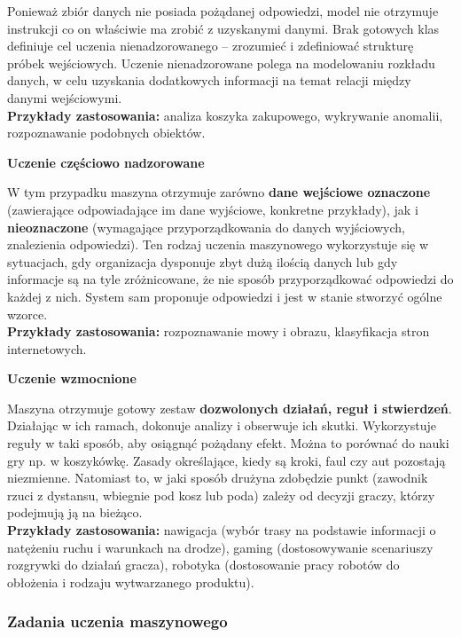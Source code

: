 Ponieważ zbiór danych nie posiada pożądanej odpowiedzi, model nie otrzymuje instrukcji co on właściwie ma zrobić z uzyskanymi danymi. Brak gotowych klas definiuje cel uczenia nienadzorowanego – zrozumieć i zdefiniować strukturę próbek wejściowych. Uczenie nienadzorowane polega na modelowaniu rozkładu danych, w celu uzyskania dodatkowych informacji na temat relacji między danymi wejściowymi. \\

\textbf{Przykłady zastosowania:} analiza koszyka zakupowego, wykrywanie anomalii, rozpoznawanie podobnych obiektów. \\

\centerline{\textbf{Uczenie częściowo nadzorowane}}

W tym przypadku maszyna otrzymuje zarówno \textbf{dane wejściowe oznaczone} (zawierające odpowiadające im dane wyjściowe, konkretne przykłady), jak i \textbf{nieoznaczone} (wymagające przyporządkowania do danych wyjściowych, znalezienia odpowiedzi). Ten rodzaj uczenia maszynowego wykorzystuje się w sytuacjach, gdy organizacja dysponuje zbyt dużą ilością danych lub gdy informacje są na tyle zróżnicowane, że nie sposób przyporządkować odpowiedzi do każdej z nich. System sam proponuje odpowiedzi i jest w stanie stworzyć ogólne wzorce.\\

\textbf{Przykłady zastosowania:} rozpoznawanie mowy i obrazu, klasyfikacja stron internetowych.\\

\centerline{\textbf{Uczenie wzmocnione}}

Maszyna otrzymuje gotowy zestaw \textbf{dozwolonych działań, reguł i stwierdzeń}. Działając w ich ramach, dokonuje analizy i obserwuje ich skutki. Wykorzystuje reguły w taki sposób, aby osiągnąć pożądany efekt. Można to porównać do nauki gry np. w koszykówkę. Zasady określające, kiedy są kroki, faul czy aut pozostają niezmienne. Natomiast to, w jaki sposób drużyna zdobędzie punkt (zawodnik rzuci z dystansu, wbiegnie pod kosz lub poda) zależy od decyzji graczy, którzy podejmują ją na bieżąco.\\

\textbf{Przykłady zastosowania:} nawigacja (wybór trasy na podstawie informacji o natężeniu ruchu i warunkach na drodze), gaming (dostosowywanie scenariuszy rozgrywki do działań gracza), robotyka (dostosowanie pracy robotów do obłożenia i rodzaju wytwarzanego produktu).\\

\subsubsection{Zadania uczenia maszynowego}

